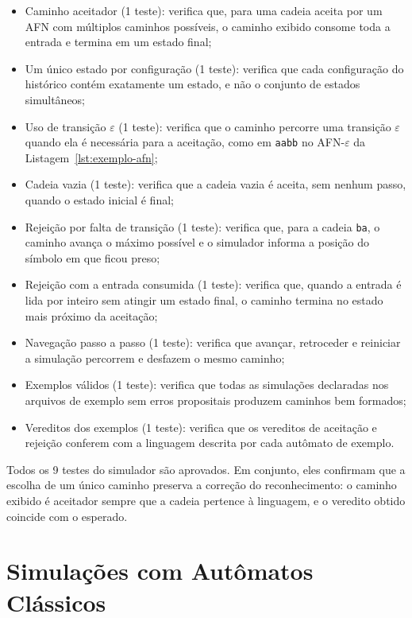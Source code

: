 \documentclass[
    12pt
    ,oneside
    ,a4paper
    ,chapter=TITLE
    ,section=TITLE
    ,sumario=abnt-6027-2012]{abntex2}
\begin{document}
\begin{itemize}
    \item Caminho aceitador (1 teste): verifica que, para uma cadeia aceita por um AFN
          com múltiplos caminhos possíveis, o caminho exibido consome toda a entrada e
          termina em um estado final;
    \item Um único estado por configuração (1 teste): verifica que cada configuração do
          histórico contém exatamente um estado, e não o conjunto de estados simultâneos;
    \item Uso de transição $\varepsilon$ (1 teste): verifica que o caminho percorre uma
          transição $\varepsilon$ quando ela é necessária para a aceitação, como em
          \texttt{aabb} no AFN-$\varepsilon$ da Listagem~\ref{lst:exemplo-afn};
    \item Cadeia vazia (1 teste): verifica que a cadeia vazia é aceita, sem nenhum passo,
          quando o estado inicial é final;
    \item Rejeição por falta de transição (1 teste): verifica que, para a cadeia
          \texttt{ba}, o caminho avança o máximo possível e o simulador informa a posição
          do símbolo em que ficou preso;
    \item Rejeição com a entrada consumida (1 teste): verifica que, quando a entrada é
          lida por inteiro sem atingir um estado final, o caminho termina no estado mais
          próximo da aceitação;
    \item Navegação passo a passo (1 teste): verifica que avançar, retroceder e
          reiniciar a simulação percorrem e desfazem o mesmo caminho;
    \item Exemplos válidos (1 teste): verifica que todas as simulações declaradas nos
          arquivos de exemplo sem erros propositais produzem caminhos bem formados;
    \item Vereditos dos exemplos (1 teste): verifica que os vereditos de aceitação e
          rejeição conferem com a linguagem descrita por cada autômato de exemplo.
\end{itemize}

Todos os 9 testes do simulador são aprovados. Em conjunto, eles confirmam que a escolha
de um único caminho preserva a correção do reconhecimento: o caminho exibido é aceitador
sempre que a cadeia pertence à linguagem, e o veredito obtido coincide com o esperado.

\section{Simulações com Autômatos Clássicos}
\label{sec:res-classicos}
\end{document}
